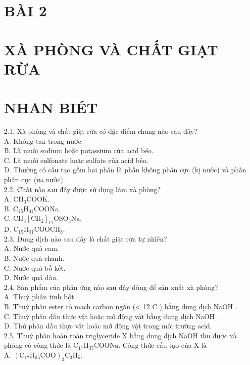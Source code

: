 \documentclass[10pt]{article}
\begin{document}
\section*{BÀI 2}
\section*{XÀ PHÒNG VÀ CHẤT GIẠT RỪA}
\section*{NHAN BIÉT}
2.1. Xà phòng và chất giặt rửa có đặc điểm chung nào sau đây?\\
A. Không tan trong nước.\\
B. Là muối sodium hoặc potassium của acid béo.\\
C. Là muối sulfonate hoặc sulfate của acid béo.\\
D. Thường có cấu tạo gồm hai phần là phần không phân cực (kị nước) và phần phân cực (ưa nước).\\
2.2. Chất nào sau đây được sử dụng làm xà phòng?\\
A. $\mathrm{CH}_{3} \mathrm{COOK}$.\\
B. $\mathrm{C}_{15} \mathrm{H}_{31} \mathrm{COONa}$.\\
C. $\mathrm{CH}_{3}\left[\mathrm{CH}_{2}\right]_{11} \mathrm{OSO}_{3} \mathrm{Na}$.\\
D. $\mathrm{C}_{15} \mathrm{H}_{31} \mathrm{COOCH}_{3}$.\\
2.3. Dung dịch nào sau đây là chất giặt rửa tự nhiên?\\
A. Nước quả cam.\\
B. Nước quả chanh.\\
C. Nước quả bồ kết.\\
D. Nước quá dâu.\\
2.4. Sản phẩm của phản ứng nào sau đây dùng để sản xuất xà phòng?\\
A. Thuỷ phân tinh bột.\\
B. Thuỷ phân ester có mạch carbon ngắn (< 12 C ) bằng dung dịch NaOH .\\
C. Thuỷ phân dầu thực vật hoặc mỡ động vật bằng dung dịch NaOH .\\
D. Thử phân dầu thực vật hoặc mỡ động vật trong môi trường acid.\\
2.5. Thuỷ phân hoàn toàn triglyceride X bằng dung dịch NaOH thu được xà phòng có công thức là $\mathrm{C}_{17} \mathrm{H}_{35} \mathrm{COONa}$. Công thức cấu tạo của X là\\
A. $\left(\mathrm{C}_{17} \mathrm{H}_{35} \mathrm{COO}\right)_{3} \mathrm{C}_{3} \mathrm{H}_{5}$.\\
\end{document}
